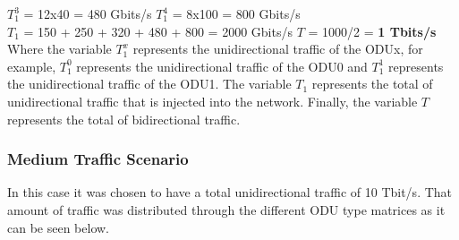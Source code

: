 $T_1^3$ = 12x40 = 480 Gbits/s \quad
$T_1^4$ = 8x100 = 800 Gbits/s \\

$T_{1}$ = 150 + 250 + 320 + 480 + 800 = 2000 Gbits/s \qquad
$T$ = 1000/2 = \textbf{1 Tbits/s}\\

Where the variable $T_1^x$ represents the unidirectional traffic of the ODUx, for example, $T_1^0$ represents the unidirectional traffic of the ODU0 and $T_1^1$ represents the unidirectional traffic of the ODU1. The variable $T_{1}$ represents the total of unidirectional traffic that is injected into the network. Finally, the variable $T$ represents the total of bidirectional traffic.

\subsubsection{Medium Traffic Scenario}
\label{medium}
In this case it was chosen to have a total unidirectional traffic of 10 Tbit/s. That amount of traffic was distributed through the different ODU type matrices as it can be seen below. 


